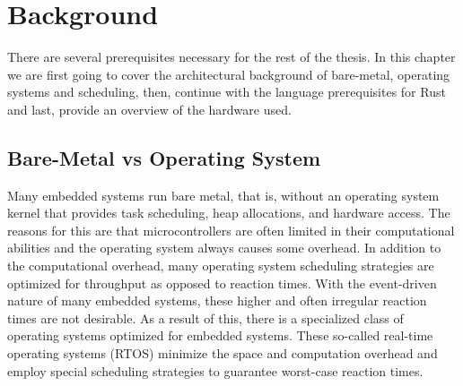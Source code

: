 \chapter{Background}
\label{chap:background}

There are several prerequisites necessary for the rest of the thesis.
In this chapter we are first going to cover the architectural background of bare-metal, operating systems and scheduling,
then, continue with the language prerequisites for Rust and last, provide an overview of the hardware used.

\section{Bare-Metal vs Operating System}
\label{sec:background:bm_vs_os}

Many embedded systems run bare metal, that is, without an operating system kernel that provides task scheduling, heap allocations, and hardware access.
The reasons for this are that microcontrollers are often limited in their computational abilities and the operating system always causes some overhead.
In addition to the computational overhead, many operating system scheduling strategies are optimized for throughput as opposed to reaction times.
With the event-driven nature of many embedded systems, these higher and often irregular reaction times are not desirable.
As a result of this, there is a specialized class of operating systems optimized for embedded systems.
These so-called real-time operating systems (RTOS) \cite{MarwedelPeter2021SS} minimize the space and computation overhead and employ special scheduling strategies to guarantee worst-case reaction times.

